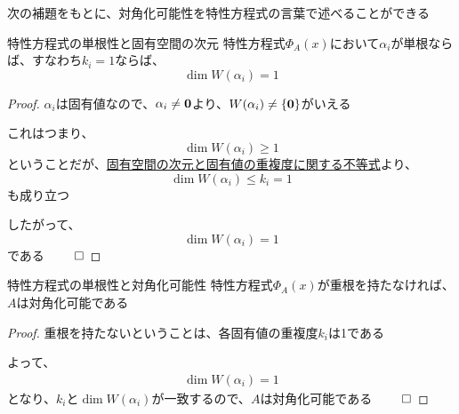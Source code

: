 \documentclass[../../../topic_linear-algebra]{subfiles}
\begin{document}
\sectionline

次の補題をもとに、対角化可能性を特性方程式の言葉で述べることができる

\begin{theorem*}{特性方程式の単根性と固有空間の次元}
  特性方程式$\Phi_A(x)$において$\alpha_i$が単根ならば、すなわち$k_i = 1$ならば、
  \begin{equation*}
    \dim W(\alpha_i) = 1
  \end{equation*}
\end{theorem*}

\begin{proof}
  $\alpha_i$は固有値なので、$\alpha_i \neq \vb*{0}$より、$W(\alpha_i) \neq \{\vb*{0}\}$がいえる

  これはつまり、
  \begin{equation*}
    \dim W(\alpha_i) \geq 1
  \end{equation*}
  ということだが、\hyperref[thm:geom-mult-leq-alg-mult]{固有空間の次元と固有値の重複度に関する不等式}より、
  \begin{equation*}
    \dim W(\alpha_i) \leq k_i = 1
  \end{equation*}
  も成り立つ

  したがって、
  \begin{equation*}
    \dim W(\alpha_i) = 1
  \end{equation*}
  である $\qed$
\end{proof}

\br

\begin{theorem*}{特性方程式の単根性と対角化可能性}
  特性方程式$\Phi_A(x)$が重根を持たなければ、$A$は対角化可能である
\end{theorem*}

\begin{proof}
  重根を持たないということは、各固有値の重複度$k_i$は1である

  よって、
  \begin{gather*}
    \dim W(\alpha_i) = 1
  \end{gather*}
  となり、$k_i$と$\dim W(\alpha_i)$が一致するので、$A$は対角化可能である  $\qed$
\end{proof}
\end{document}

